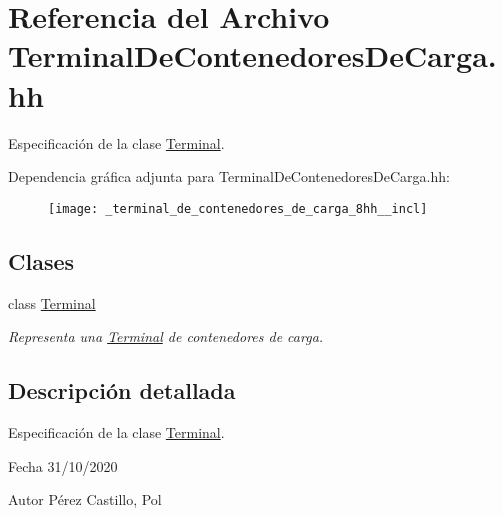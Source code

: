\hypertarget{_terminal_de_contenedores_de_carga_8hh}{}\section{Referencia del Archivo Terminal\+De\+Contenedores\+De\+Carga.\+hh}
\label{_terminal_de_contenedores_de_carga_8hh}


Especificación de la clase \hyperlink{class_terminal}{Terminal}.  


Dependencia gráfica adjunta para Terminal\+De\+Contenedores\+De\+Carga.\+hh\+:\nopagebreak
\begin{figure}[H]
\begin{center}
\leavevmode
\texttt{[image: \_terminal\_de\_contenedores\_de\_carga\_8hh\_\_incl]}
\end{center}
\end{figure}
\subsection*{Clases}
\begin{DoxyCompactItemize}
\item 
class \hyperlink{class_terminal}{Terminal}
\begin{DoxyCompactList}\small\item\em Representa una \hyperlink{class_terminal}{Terminal} de contenedores de carga. \end{DoxyCompactList}\end{DoxyCompactItemize}


\subsection{Descripción detallada}
Especificación de la clase \hyperlink{class_terminal}{Terminal}. 

\begin{DoxyDate}{Fecha}
31/10/2020 
\end{DoxyDate}
\begin{DoxyAuthor}{Autor}
Pérez Castillo, Pol 
\end{DoxyAuthor}
